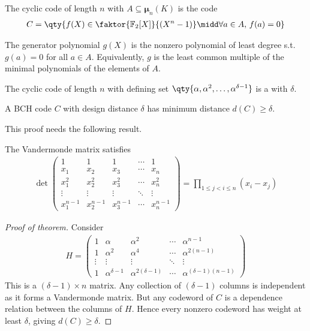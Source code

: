 \begin{definition}
    The cyclic code of length $n$ with  $A \subseteq \bm\mu_n(K)$ is the code
    \begin{align*}
        C = \qty{f(X) \in \faktor{\mathbb F_2[X]}{(X^n - 1)} \midd \forall a \in A,\, f(a) = 0}
    \end{align*}
\end{definition}

The generator polynomial $g(X)$ is the nonzero polynomial of least degree s.t. $g(a) = 0$ for all $a \in A$.
Equivalently, $g$ is the least common multiple of the minimal polynomials of the elements of $A$.

\begin{definition}
    The cyclic code of length $n$ with defining set $\qty{\alpha, \alpha^2, \dots, \alpha^{\delta - 1}}$ is a  with  $\delta$.
\end{definition}

\begin{theorem}
    A BCH code $C$ with design distance $\delta$ has minimum distance $d(C) \geq \delta$.
\end{theorem}

This proof needs the following result.

\begin{lemma}
    The Vandermonde matrix satisfies
    \begin{align*}
        \det \begin{pmatrix}
            1 & 1 & 1 & \cdots & 1 \\
            x_1 & x_2 & x_3 & \cdots & x_n \\
            x_1^2 & x_2^2 & x_3^2 & \cdots & x_n^2 \\
            \vdots & \vdots & \vdots & \ddots & \vdots \\
            x_1^{n-1} & x_2^{n-1} & x_3^{n-1} & \cdots & x_n^{n-1}
        \end{pmatrix} = \prod_{1 \leq j < i \leq n} (x_i - x_j)
    \end{align*}
\end{lemma}

\begin{proof}[Proof of theorem]
    Consider
    \begin{align*}
        H = \begin{pmatrix}
            1 & \alpha & \alpha^2 & \cdots & \alpha^{n-1} \\
            1 & \alpha^2 & \alpha^4 & \cdots & \alpha^{2(n-1)} \\
            \vdots & \vdots & \vdots & \ddots & \vdots \\
            1 & \alpha^{\delta - 1} & \alpha^{2(\delta - 1)} & \cdots & \alpha^{(\delta - 1)(n-1)}
        \end{pmatrix}
    \end{align*}
    This is a $(\delta - 1) \times n$ matrix.
    Any collection of $(\delta - 1)$ columns is independent as it forms a Vandermonde matrix.
    But any codeword of $C$ is a dependence relation between the columns of $H$.
    Hence every nonzero codeword has weight at least $\delta$, giving $d(C) \geq \delta$.
\end{proof}

